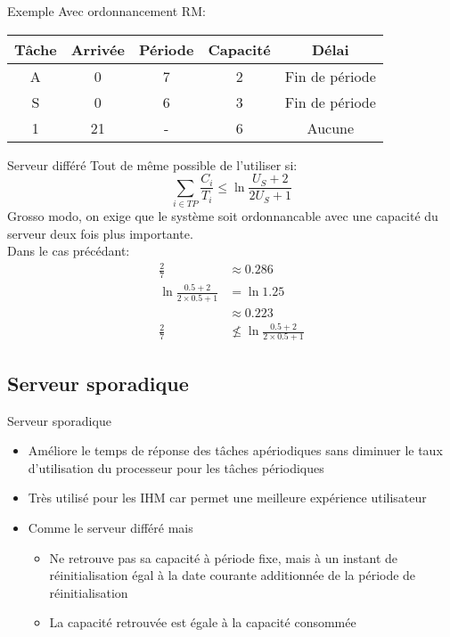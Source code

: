 \begin{frame}{Exemple}
  Avec ordonnancement RM:
  \begin{center}
    \begin{tabular}{ccccc}
      \hline
      Tâche & Arrivée & Période & Capacité & Délai \\
      \hline
      A &  0 & 7 & 2 & Fin de période\\
      S &  0 & 6 & 3 & Fin de période\\
      1 & 21 & - & 6 & Aucune\\
      \hline
    \end{tabular}
    \pause
    
  \end{center}
\end{frame} 

\begin{frame}{Serveur différé}
  Tout de même possible de l'utiliser si:
  $$\sum_{i \in TP} \frac{C_i}{T_i} ≤ \ln \frac{U_S + 2}{2U_S + 1}$$
  Grosso modo,  on exige  que le système  soit ordonnancable  avec une
  capacité du serveur deux fois plus importante.\\
  \pause
  Dans le cas précédant:
  \begin{align*}
    \frac{2}{7} &≈ 0.286\\
    \ln \frac{0.5 + 2}{2 \times 0.5 + 1} &=  \ln 1.25 \\
         &≈ 0.223\\
    \frac{2}{7} &\nleq \ln \frac{0.5 + 2}{2 \times 0.5 + 1}
  \end{align*}
\end{frame}

\subsection{Serveur sporadique}

\begin{frame}{Serveur sporadique}
  \begin{itemize}
  \item  Améliore le  temps de  réponse des  tâches  apériodiques sans
    diminuer  le  taux d'utilisation  du  processeur  pour les  tâches
    périodiques
  \item Très utilisé pour les  IHM car permet une meilleure expérience
    utilisateur
  \item Comme le serveur différé mais 
    \begin{itemize}
    \item  Ne retrouve  pas  sa capacité  à  période fixe,  mais à  un
      instant de réinitialisation égal  à la date courante additionnée
      de la période de réinitialisation
      \item La capacité retrouvée est égale à la capacité consommée 
      \end{itemize}
    \end{itemize}
\end{frame} 

